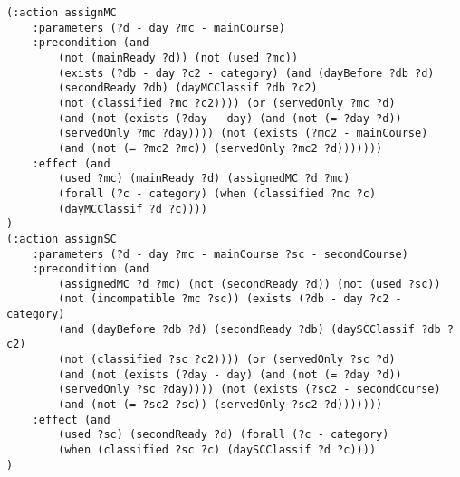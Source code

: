 \documentclass{article}
\begin{document}
\begin{lstlisting}[language=pddl]
(:action assignMC
    :parameters (?d - day ?mc - mainCourse)
    :precondition (and
        (not (mainReady ?d)) (not (used ?mc))
        (exists (?db - day ?c2 - category) (and (dayBefore ?db ?d)
        (secondReady ?db) (dayMCClassif ?db ?c2)
        (not (classified ?mc ?c2)))) (or (servedOnly ?mc ?d)
        (and (not (exists (?day - day) (and (not (= ?day ?d))
        (servedOnly ?mc ?day)))) (not (exists (?mc2 - mainCourse)
        (and (not (= ?mc2 ?mc)) (servedOnly ?mc2 ?d)))))))
    :effect (and
        (used ?mc) (mainReady ?d) (assignedMC ?d ?mc)
        (forall (?c - category) (when (classified ?mc ?c)
        (dayMCClassif ?d ?c))))
)
(:action assignSC
    :parameters (?d - day ?mc - mainCourse ?sc - secondCourse)
    :precondition (and
        (assignedMC ?d ?mc) (not (secondReady ?d)) (not (used ?sc))
        (not (incompatible ?mc ?sc)) (exists (?db - day ?c2 - category)
        (and (dayBefore ?db ?d) (secondReady ?db) (daySCClassif ?db ?c2)
        (not (classified ?sc ?c2)))) (or (servedOnly ?sc ?d)
        (and (not (exists (?day - day) (and (not (= ?day ?d))
        (servedOnly ?sc ?day)))) (not (exists (?sc2 - secondCourse)
        (and (not (= ?sc2 ?sc)) (servedOnly ?sc2 ?d)))))))
    :effect (and
        (used ?sc) (secondReady ?d) (forall (?c - category)
        (when (classified ?sc ?c) (daySCClassif ?d ?c))))
)
\end{lstlisting}
\end{document}
